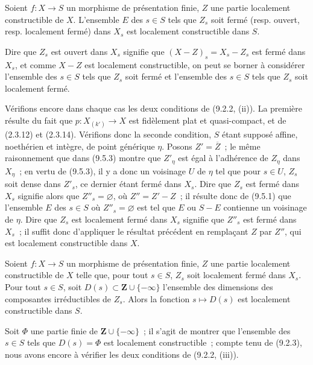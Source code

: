 \begin{corollary}[9.5.4]
\label{IV.9.5.4-fr}
Soient $f:X\to S$ un morphisme de présentation finie, $Z$ une partie
localement constructible de $X$. L'ensemble $E$ des $s\in S$ tels que $Z_s$
soit fermé \textnormal{(}resp. ouvert, resp. localement fermé\textnormal{)}
dans $X_s$ est localement constructible dans $S$.
\end{corollary}

Dire que $Z_s$ est ouvert dans $X_s$ signifie que
$(X-Z)_s=X_s-Z_s$ est fermé dans $X_s$, et comme $X-Z$ est localement
constructible, on peut se borner à considérer l'ensemble des $s\in S$ tels que
$Z_s$ soit fermé et l'ensemble des $s\in S$ tels que $Z_s$ soit localement
fermé.

Vérifions encore dans chaque cas les deux conditions de (9.2.2, (ii)). La
première résulte du fait que $p:X_{(k')}\to X$ est fidèlement plat et
quasi-compact, et de (2.3.12) et (2.3.14). Vérifions donc la seconde condition,
$S$ étant supposé affine, noethérien et intègre, de point générique $\eta$.
Posons $Z'=\overline Z$~; le même raisonnement que dans (9.5.3) montre que
$Z'_\eta$ est égal à l'adhérence de $Z_\eta$ dans $X_\eta$~; en vertu de
(9.5.3), il y a donc un voisinage $U$ de $\eta$ tel que pour $s\in U$, $Z_s$
soit dense dans $Z'_s$, ce dernier étant fermé dans $X_s$. Dire que $Z_s$ est
fermé dans $X_s$ signifie alors que $Z''_s=\varnothing$, où $Z''=Z'-Z$~; il
résulte donc de (9.5.1) que l'ensemble $E$ des $s\in S$ où
$Z''_s=\varnothing$ est tel que $E$ ou $S-E$ contienne un voisinage de
$\eta$. Dire que $Z_s$ est localement fermé dans $X_s$ signifie que $Z''_s$
est fermé dans $X_s$~; il suffit donc d'appliquer le résultat précédent en
remplaçant $Z$ par $Z''$, qui est localement constructible dans $X$.


\begin{proposition}[9.5.5]
\label{IV.9.5.5-fr}
Soient $f:X\to S$ un morphisme de présentation finie, $Z$ une partie
localement constructible de $X$ telle que, pour tout $s\in S$, $Z_s$ soit
localement fermé dans $X_s$. Pour tout $s\in S$, soit
$D(s)\subset\mathbf Z\cup\{-\infty\}$ l'ensemble des dimensions des
composantes irréductibles de $Z_s$. Alors la fonction $s\mapsto D(s)$ est
localement constructible dans $S$.
\end{proposition}

Soit $\Phi$ une partie finie de $\mathbf Z\cup\{-\infty\}$~; il s'agit de
montrer que l'ensemble des $s\in S$ tels que $D(s)=\Phi$ est localement
constructible~; compte tenu de (9.2.3), nous avons encore à vérifier les deux
conditions de (9.2.2, (iii)).


